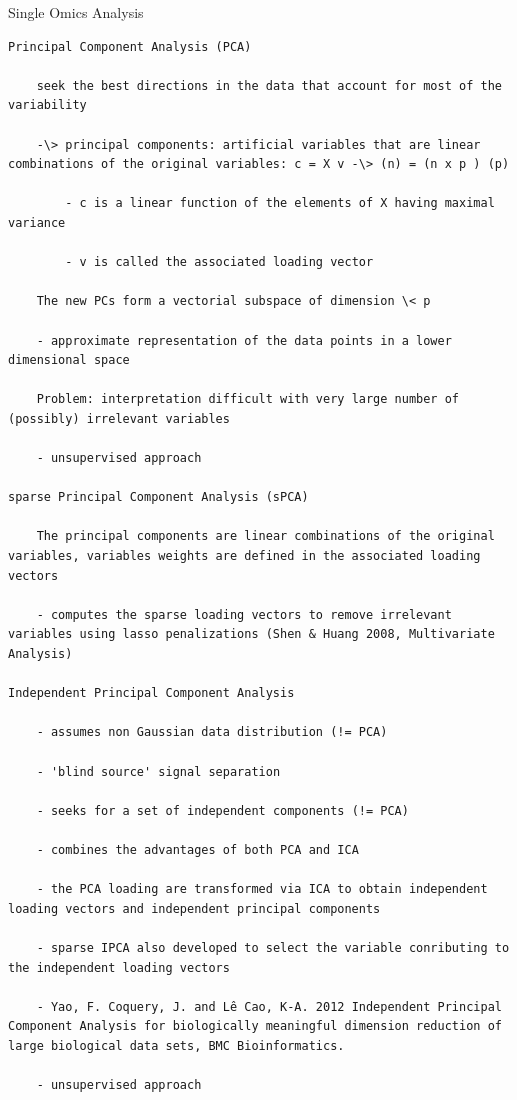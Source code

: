 \documentclass[
]{book}
\begin{document}
Single Omics Analysis

\begin{verbatim}
Principal Component Analysis (PCA)

    seek the best directions in the data that account for most of the variability

    -\> principal components: artificial variables that are linear combinations of the original variables: c = X v -\> (n) = (n x p ) (p)

        - c is a linear function of the elements of X having maximal variance

        - v is called the associated loading vector

    The new PCs form a vectorial subspace of dimension \< p

    - approximate representation of the data points in a lower dimensional space

    Problem: interpretation difficult with very large number of (possibly) irrelevant variables

    - unsupervised approach

sparse Principal Component Analysis (sPCA)

    The principal components are linear combinations of the original variables, variables weights are defined in the associated loading vectors

    - computes the sparse loading vectors to remove irrelevant variables using lasso penalizations (Shen & Huang 2008, Multivariate Analysis)

Independent Principal Component Analysis

    - assumes non Gaussian data distribution (!= PCA)

    - 'blind source' signal separation

    - seeks for a set of independent components (!= PCA)

    - combines the advantages of both PCA and ICA

    - the PCA loading are transformed via ICA to obtain independent loading vectors and independent principal components

    - sparse IPCA also developed to select the variable conributing to the independent loading vectors

    - Yao, F. Coquery, J. and Lê Cao, K-A. 2012 Independent Principal Component Analysis for biologically meaningful dimension reduction of large biological data sets, BMC Bioinformatics.

    - unsupervised approach


\end{verbatim}
\end{document}

